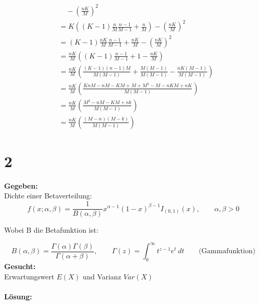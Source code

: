 \documentclass{article}
\begin{document}
\begin{align*}
        &\quad- \left(\frac{nK}{M}\right)^2 \\
        &= K\left((K-1)\frac{n}{M} \frac{n-1}{M-1} + \frac{n}{M} \right) - \left(\frac{nK}{M}\right)^2 \\
        &= (K-1)\frac{nK}{M}\frac{n-1}{M-1} + \frac{nK}{M} - \left(\frac{nK}{M}\right)^2\\
        &= \frac{nK}{M}\left((K-1)\frac{n-1}{M-1}+ 1 - \frac{nK}{M}\right) \\
        &= \frac{nK}{M}\left(\frac{(K-1)(n-1)M}{M(M-1)} + \frac{M(M-1)}{M(M-1)} - \frac{nK(M-1)}{M(M-1)}\right) \\
        &= \frac{nK}{M}\left(\frac{KnM - nM - KM + M + M^2 - M - nKM + nK}{M(M-1)}\right) \\
        &= \frac{nK}{M}\left(\frac{M^2 - nM - KM + nk}{M(M-1)}\right) \\
        &= \frac{nK}{M}\left(\frac{(M-n)(M-k)}{M(M-1)}\right)
    \end{align*}


\section*{2} 
\textbf{Gegeben:}\\

Dichte einer Betaverteilung: 
\[f(x; \alpha, \beta) = \frac{1}{B(\alpha, \beta)}x^{\alpha - 1} (1-x)^{\beta - 1}I_{(0,1)}(x), \qquad \alpha, \beta > 0\]

Wobei B die Betafunktion ist:

\[B(\alpha, \beta) = \frac{\Gamma(\alpha)\Gamma(\beta)}{\Gamma(\alpha + \beta)}, \qquad \Gamma(z) = \int_0^{\infty}t^{z-1}e^t ~dt\qquad \text{(Gammafunktion)}\]
\textbf{Gesucht:}\\

Erwartungswert $E(X)$ und Varianz $Var(X)$\\\\
\textbf{Lösung:} \\
\end{document}
